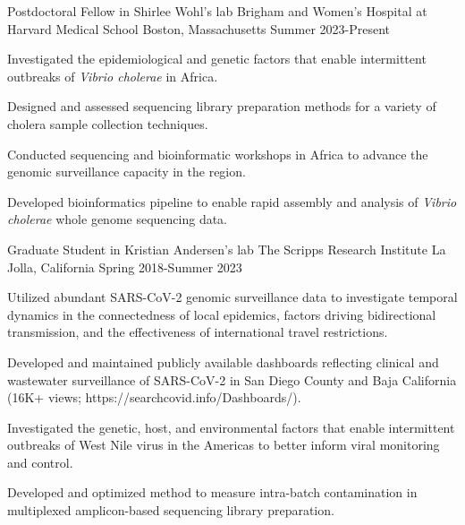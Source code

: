 
\begin{cventries}

  \cventry
    {Postdoctoral Fellow in Shirlee Wohl's lab} %
    {Brigham and Women's Hospital at Harvard Medical School} %
    {Boston, Massachusetts} %
    {Summer 2023-Present} %
    {
      \begin{cvitems} %
      \item {Investigated the epidemiological and genetic factors that enable intermittent outbreaks of \textit{Vibrio cholerae} in Africa.}
        \item {Designed and assessed sequencing library preparation methods for a variety of cholera sample collection techniques.}
        \item {Conducted sequencing and bioinformatic workshops in Africa to advance the genomic surveillance capacity in the region.}
        \item {Developed bioinformatics pipeline to enable rapid assembly and analysis of \textit{Vibrio cholerae} whole genome sequencing data.}
      \end{cvitems}
    }

  \cventry
    {Graduate Student in Kristian Andersen's lab} %
    {The Scripps Research Institute} %
    {La Jolla, California} %
    {Spring 2018-Summer 2023} %
    {
      \begin{cvitems} %
        \item {Utilized abundant SARS-CoV-2 genomic surveillance data to investigate temporal dynamics in the connectedness of local epidemics, factors driving bidirectional transmission, and the effectiveness of international travel restrictions.}
        \item {Developed and maintained publicly available dashboards reflecting clinical and wastewater surveillance of SARS-CoV-2 in San Diego County and Baja California (16K+ views; https://searchcovid.info/Dashboards/).}
        \item {Investigated the genetic, host, and environmental factors that enable intermittent outbreaks of West Nile virus in the Americas to better inform viral monitoring and control.}
        \item {Developed and optimized method to measure intra-batch contamination in multiplexed amplicon-based sequencing library preparation.}
      \end{cvitems}
    }


\end{cventries}
